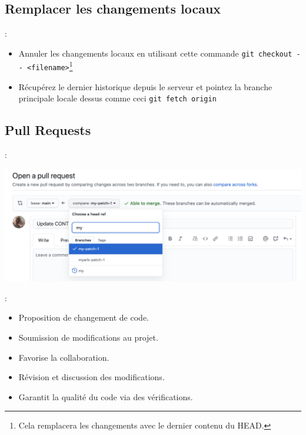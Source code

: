 \documentclass[10pt]{beamer}
\begin{document}
\subsection{Remplacer les changements locaux}
\begin{frame}{\secname : \subsecname}
    \begin{itemize}
        \item Annuler les changements locaux en utilisant cette commande \lstinline[language=git]!git checkout -- <filename>!\footnote{Cela remplacera les changements avec le dernier contenu du HEAD.}
        \item Récupérez le dernier historique depuis le serveur et pointez la branche principale locale dessus comme ceci \lstinline[language=git]!git fetch origin!
    \end{itemize}
\end{frame}

\subsection{Pull Requests}
\begin{frame}{\secname : \subsecname}
    \centerline{\includegraphics[width=\textwidth]{img/pull-request-review-edit-branch.png}}
\end{frame}

\begin{frame}{\secname : \subsecname}
    \begin{itemize}
        \item Proposition de changement de code.
        \item Soumission de modifications au projet.
        \item Favorise la collaboration.
        \item Révision et discussion des modifications.
        \item Garantit la qualité du code via des vérifications.
    \end{itemize}
\end{frame}
\end{document}
